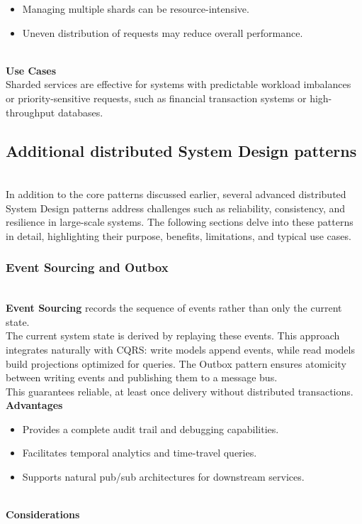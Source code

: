 \begin{itemize}
\item
\protect{}\label{SeyxYYqIYZy2A_EfO84FB}
Managing multiple shards can be resource-intensive.
\item
\protect{}\label{U7_o9kKw9A4ylE0sa0XLN}
Uneven distribution of requests may reduce overall performance.
\end{itemize}
\\
\textbf{Use Cases}
\\
Sharded services are effective for systems with predictable workload imbalances or priority-sensitive requests, such as financial transaction systems or high-throughput databases.

\subsection{Additional distributed System Design patterns}\label{R1DmVU5GVb9Cwc6yKxeYz}
\\
In addition to the core patterns discussed earlier, several advanced distributed System Design patterns address challenges such as reliability, consistency, and resilience in large-scale systems. The following sections delve into these patterns in detail, highlighting their purpose, benefits, limitations, and typical use cases.

\subsubsection{Event Sourcing and Outbox}\label{hn4490Xg707pkHfSh3X8T}
\\
\textbf{Event Sourcing} records the sequence of events rather than only the current state.
\\
The current system state is derived by replaying these events. This approach integrates naturally with CQRS: write models append events, while read models build projections optimized for queries. The Outbox pattern ensures atomicity between writing events and publishing them to a message bus.
\\
This guarantees reliable, at least once delivery without distributed transactions.
\\
\textbf{Advantages}

\begin{itemize}
\item
\protect{}\label{-dF0NaAhPrsg8va2ay4HY}
Provides a complete audit trail and debugging capabilities.
\item
\protect{}\label{w-v9uWuJ1lDJKR07DjHYU}
Facilitates temporal analytics and time-travel queries.
\item
\protect{}\label{GV50y3waHqoWUiRQwK3xp}
Supports natural pub/sub architectures for downstream services.
\end{itemize}
\\
\textbf{Considerations}


